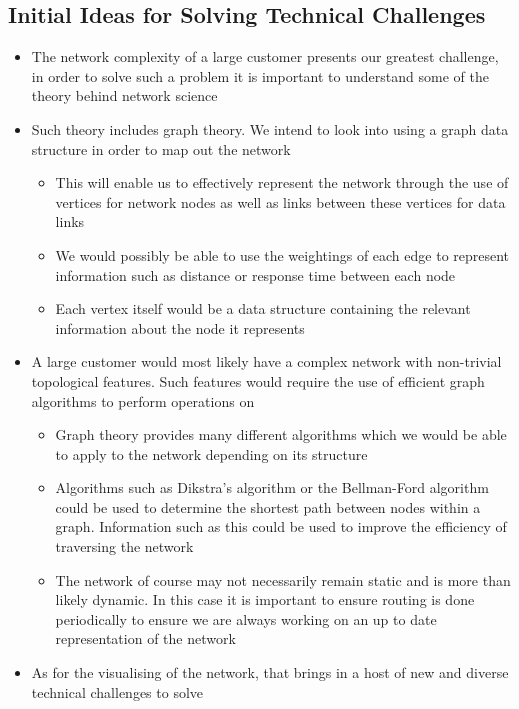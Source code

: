 \documentclass{article}
\begin{document}
	\subsection{Initial Ideas for Solving Technical Challenges}
		\begin{itemize}
			\item The network complexity of a large customer presents our greatest challenge, in order to solve such a problem it is important to understand some of the theory behind network science
			\item Such theory includes graph theory. We intend to look into using a graph data structure in order to map out the network
			\begin{itemize}
				\item This will enable us to effectively represent the network through the use of vertices for network nodes as well as links between these vertices for data links
				\item We would possibly be able to use the weightings of each edge to represent information such as distance or response time between each node
				\item Each vertex itself would be a data structure containing the relevant information about the node it represents
			\end{itemize}
			\item A large customer would most likely have a complex network with non-trivial topological features. Such features would require the use of efficient graph algorithms to perform operations on
			\begin{itemize}
				\item Graph theory provides many different algorithms which we would be able to apply to the network depending on its structure
				\item Algorithms such as Dikstra's algorithm or the Bellman-Ford algorithm could be used to determine the shortest path between nodes within a graph. Information such as this could be used to improve the efficiency of traversing the network
				\item The network of course may not necessarily remain static and is more than likely dynamic. In this case it is important to ensure routing is done periodically to ensure we are always working on an up to date representation of the network
			\end{itemize}
			\item As for the visualising of the network, that brings in a host of new and diverse technical challenges to solve

\end{itemize}
\end{document}
